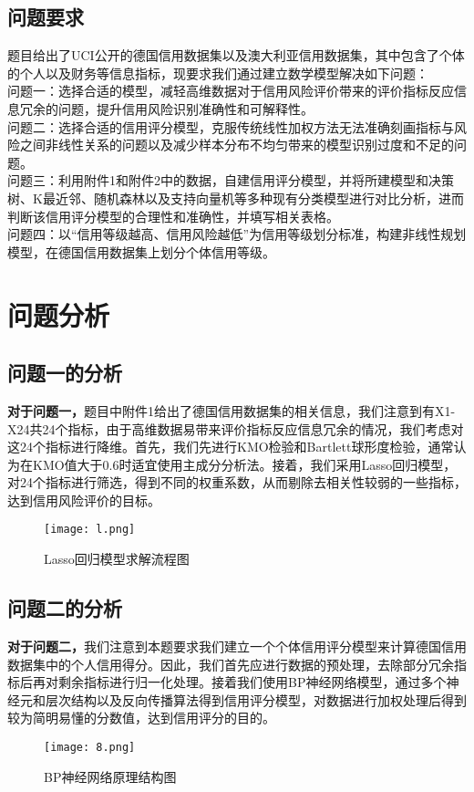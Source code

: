 \documentclass[12pt,a4paper]{nmmcm}
\begin{document}
\subsection{问题要求}
\setlength{\parindent}{2em}
题目给出了UCI公开的德国信用数据集以及澳大利亚信用数据集，其中包含了个体的个人以及财务等信息指标，现要求我们通过建立数学模型解决如下问题：
\\\hspace*{2em}问题一：选择合适的模型，减轻高维数据对于信用风险评价带来的评价指标反应信息冗余的问题，提升信用风险识别准确性和可解释性。
\\\hspace*{2em}问题二：选择合适的信用评分模型，克服传统线性加权方法无法准确刻画指标与风险之间非线性关系的问题以及减少样本分布不均匀带来的模型识别过度和不足的问题。
\\\hspace*{2em}问题三：利用附件1和附件2中的数据，自建信用评分模型，并将所建模型和决策树、K最近邻、随机森林以及支持向量机等多种现有分类模型进行对比分析，进而判断该信用评分模型的合理性和准确性，并填写相关表格。
\\\hspace*{2em}问题四：以“信用等级越高、信用风险越低”为信用等级划分标准，构建非线性规划模型，在德国信用数据集上划分个体信用等级。


\section{问题分析}
\subsection{问题一的分析}
 \textbf{对于问题一，}题目中附件1给出了德国信用数据集的相关信息，我们注意到有X1-X24共24个指标，由于高维数据易带来评价指标反应信息冗余的情况，我们考虑对这24个指标进行降维。首先，我们先进行KMO检验和Bartlett球形度检验，通常认为在KMO值大于0.6时适宜使用主成分分析法。接着，我们采用Lasso回归模型，对24个指标进行筛选，得到不同的权重系数，从而剔除去相关性较弱的一些指标，达到信用风险评价的目标。

\begin{figure}
    \centering
    \texttt{[image: l.png]}
    \caption{Lasso回归模型求解流程图}
    \label{fig:enter-label}
\end{figure}

\subsection{问题二的分析}
 \textbf{对于问题二，}我们注意到本题要求我们建立一个个体信用评分模型来计算德国信用数据集中的个人信用得分。因此，我们首先应进行数据的预处理，去除部分冗余指标后再对剩余指标进行归一化处理。接着我们使用BP神经网络模型，通过多个神经元和层次结构以及反向传播算法得到信用评分模型，对数据进行加权处理后得到较为简明易懂的分数值，达到信用评分的目的。
\begin{figure}
    \centering
    \texttt{[image: 8.png]}
    \caption{BP神经网络原理结构图}
    \label{fig:enter-label}
\end{figure}
\end{document}
